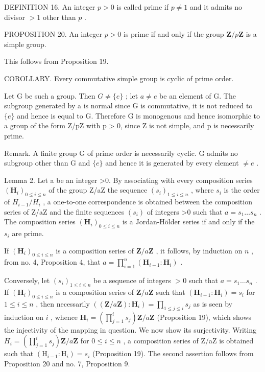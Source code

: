 DEFINITION 16. An integer \(p > 0\) is called prime if \(p \neq 1\) and it admits no divisor \(> 1\) other than \(p\) .

PROPOSITION 20. An integer \(p > 0\) is prime if and only if the group \(\mathbf{Z} / p\mathbf{Z}\) is a simple group.

This follows from Proposition 19.

COROLLARY. Every commutative simple group is cyclic of prime order.

Let G be such a group. Then \(G \neq \{e\}\) ; let \(a \neq e\) be an element of G. The subgroup generated by a is normal since G is commutative, it is not reduced to \(\{e\}\) and hence is equal to G. Therefore G is monogenous and hence isomorphic to a group of the form Z/pZ with p \textgreater{} 0, since Z is not simple, and p is necessarily prime.

Remark. A finite group G of prime order is necessarily cyclic. G admits no subgroup other than G and \(\{e\}\) and hence it is generated by every element \(\neq e\) .

Lemma 2. Let a be an integer \textgreater0. By associating with every composition series \((\mathbf{H}_{i})_{0\leqslant i\leqslant n}\) of the group Z/aZ the sequence \((s_{i})_{1\leqslant i\leqslant n}\) , where \(s_{i}\) is the order of \(H_{i-1}/H_{i}\) , a one-to-one correspondence is obtained between the composition series of Z/aZ and the finite sequences \((s_{i})\) of integers \textgreater0 such that \(a=s_{1}\ldots s_{n}\) . The composition series \((\mathbf{H}_{i})_{0\leqslant i\leqslant n}\) is a Jordan-Hölder series if and only if the \(s_{i}\) are prime.

If \((\mathbf{H}_i)_{0\leqslant i\leqslant n}\) is a composition series of \(\mathbf{Z} / a\mathbf{Z}\) , it follows, by induction on \(n\) , from no. 4, Proposition 4, that \(a = \prod_{i=1}^{n} (\mathbf{H}_{i-1}:\mathbf{H}_i)\) .

Conversely, let \((s_i)_{1 \leqslant i \leqslant n}\) be a sequence of integers \(>0\) such that \(a = s_1 \ldots s_n\) . If \((\mathbf{H}_i)_{0 \leqslant i \leqslant n}\) is a composition series of \(\mathbf{Z} / a\mathbf{Z}\) such that \((\mathbf{H}_{i-1} : \mathbf{H}_i) = s_i\) for \(1 \leqslant i \leqslant n\) , then necessarily \(((\mathbf{Z} / a\mathbf{Z}) : \mathbf{H}_i) = \prod_{1 \leqslant j \leqslant i} s_j\) as is seen by induction on \(i\) , whence \(\mathbf{H}_i = \left( \prod_{j=1}^{i} s_j \right) \mathbf{Z} / a\mathbf{Z}\) (Proposition 19), which shows the injectivity of the mapping in question. We now show its surjectivity. Writing \(H_{i}=\left(\prod_{j=1}^{i}s_{j}\right)\mathbf{Z}/a\mathbf{Z}\) for \(0\leqslant i\leqslant n\) , a composition series of Z/aZ is obtained such that \((\mathrm{H}_{i-1}:\mathrm{H}_{i})=s_{i}\) (Proposition 19). The second assertion follows from Proposition 20 and no. 7, Proposition 9.

